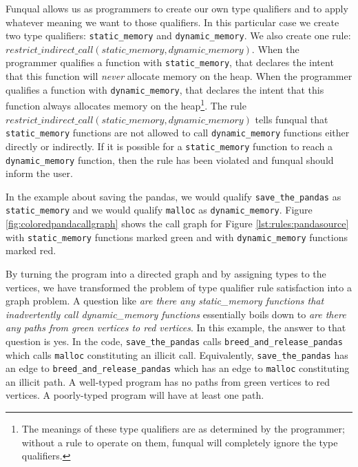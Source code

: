\begin{sloppypar}
Funqual allows us as programmers to create our own type qualifiers and to apply whatever meaning we want to those qualifiers.  In this particular case we create two type qualifiers: \lstinline{static_memory} and \mbox{\lstinline{dynamic_memory}.} We also create one rule: $restrict\_indirect\_call(static\_memory, dynamic\_memory)$. When the programmer qualifies a function with \lstinline{static_memory}, that declares the intent that this function will \textit{never} allocate memory on the heap. When the programmer qualifies a function with \lstinline{dynamic_memory}, that declares the intent that this function always allocates memory on the heap\footnote{The meanings of these type qualifiers are as determined by the programmer; without a rule to operate on them, funqual will completely ignore the type qualifiers.}. The rule $restrict\_indirect\_call(static\_memory, dynamic\_memory)$ tells funqual that \lstinline{static_memory} functions are not allowed to call \lstinline{dynamic_memory} functions either directly or indirectly. If it is possible for a \lstinline{static_memory} function to reach a \lstinline{dynamic_memory} function, then the rule has been violated and funqual should inform the user.
\end{sloppypar}

In the example about saving the pandas, we would qualify \lstinline{save_the_pandas} as \lstinline{static_memory} and we would qualify \lstinline{malloc} as \lstinline{dynamic_memory}.  Figure \ref{fig:coloredpandacallgraph} shows the call graph for Figure \ref{lst:rules:pandasource} with \lstinline{static_memory} functions marked green and with \lstinline{dynamic_memory} functions marked red.



\begin{sloppypar}
By turning the program into a directed graph and by assigning types to the vertices, we have transformed the problem of type qualifier rule satisfaction into a graph problem.  A question like \textit{are there any static\_memory functions that inadvertently call dynamic\_memory functions} essentially boils down to \textit{are there any paths from green vertices to red vertices}.  In this example, the answer to that question is yes.  In the code, \lstinline{save_the_pandas} calls \lstinline{breed_and_release_pandas} which calls \lstinline{malloc} constituting an illicit call.  Equivalently, \lstinline{save_the_pandas} has an edge to \lstinline{breed_and_release_pandas} which has an edge to \lstinline{malloc} constituting an illicit path.  A well-typed program has no paths from green vertices to red vertices.  A poorly-typed program will have at least one path.  
\end{sloppypar}


